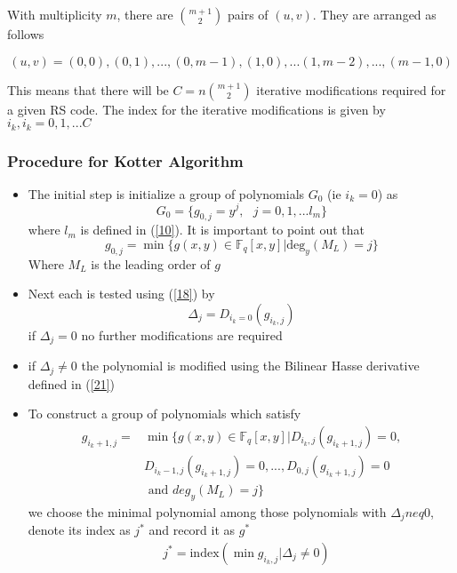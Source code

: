 \documentclass[fontsize=12pt]{article}
\begin{document}
With multiplicity $m$, there are $\binom{m+1}{2}$ pairs of $(u,v)$. They are arranged as follows

$$ (u,v) =(0,0),(0,1),...,(0,m-1), (1,0),...(1,m-2),...,(m-1,0) $$

This means that there will be $C=n\binom{m+1}{2}$ iterative modifications required for a given RS code. The index for the iterative modifications is given by $i_k, i_k=0,1,...C$

\subsubsection{Procedure for Kotter Algorithm}
\begin{itemize}
\item The initial step is initialize a group of polynomials $G_0$ (ie $i_k=0$) as
\begin{equation}
G_0=\{g_{0,j} =y^j, \,\,\,\, j=0,1,...l_m\}
\end{equation}
where $l_m$ is defined in (\ref{10}).
It is important to point out that 
\begin{equation}
g_{0,j} =\min\{g(x,y) \in \mathbb{F}_q[x,y]|\text{deg}_y(M_L) =j \}
\end{equation}
Where $M_L$ is the leading order of $g$
\item Next each is tested using (\ref{18}) by
\begin{equation}
\Delta_j =D_{i_k=0}(g_{i_k,j})
\end{equation}
if $\Delta_j =0$ no further modifications are required
\item if $\Delta_j \neq 0$ the polynomial is modified using the Bilinear Hasse derivative defined in (\ref{21})
\item To construct a group of polynomials which satisfy 
\begin{equation}
\begin{split}
g_{i_k+1,j} =&\min \Bigg\{   g(x,y) \in \mathbb{F}_q[x,y] | D_{i_k,j}(g_{i_k+1,j})=0,\\&D_{i_k-1,j}(g_{i_k+1,j})=0,...,D_{0,j}(g_{i_k+1,j})=0\\
&\text{ and } deg_y(M_L)=j
 \Bigg\}
 \end{split}
\end{equation}
we choose the minimal polynomial among those polynomials
with $\Delta_j neq 0$, denote its index as $j^*$ and record it
as $g^*$
\begin{equation}
\begin{split}
&j^* =\text{index} (\min{g_{i_k,j} | \Delta_j \neq 0})\\

\end{split}
\end{equation}
\end{itemize}
\end{document}
